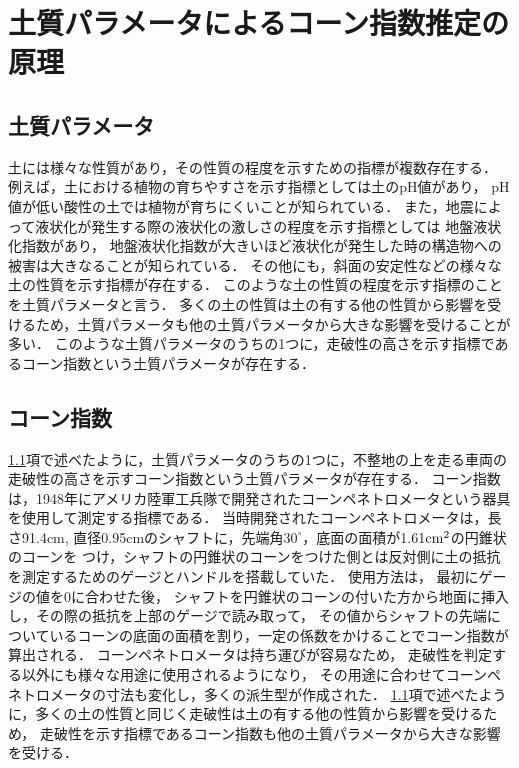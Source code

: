 \section{土質パラメータによるコーン指数推定の原理}
\label{sec:PrimciplesOfConeindexEstimation}

\subsection{土質パラメータ}
\label{ssec:SoilParameters}

土には様々な性質があり，その性質の程度を示すための指標が複数存在する．
例えば，土における植物の育ちやすさを示す指標としては土のpH値があり，
pH値が低い酸性の土では植物が育ちにくいことが知られている\cite{三枝1991}\cite{図子1993}．
また，地震によって液状化が発生する際の液状化の激しさの程度を示す指標としては
地盤液状化指数があり，
地盤液状化指数が大きいほど液状化が発生した時の構造物への被害は大きなることが知られている\cite{龍岡1980}\cite{岩崎1980}\cite{浜田1986}．
その他にも，斜面の安定性などの様々な土の性質を示す指標が存在する\cite{三笠1964}．
このような土の性質の程度を示す指標のことを土質パラメータと言う\cite{山口1986}\cite{渡部2007}．
多くの土の性質は土の有する他の性質から影響を受けるため，土質パラメータも他の土質パラメータから大きな影響を受けることが多い\cite{太田1988}\cite{三隅1992}．
このような土質パラメータのうちの1つに，走破性の高さを示す指標であるコーン指数という土質パラメータが存在する．

\subsection{コーン指数}
\label{ssec:Coneindex}

\ref{ssec:SoilParameters}項で述べたように，土質パラメータのうちの1つに，不整地の上を走る車両の走破性の高さを示すコーン指数という土質パラメータが存在する．
コーン指数は，1948年にアメリカ陸軍工兵隊で開発されたコーンペネトロメータという器具を使用して測定する指標である\cite{WES1948}\cite{Perumpral1987}．
当時開発されたコーンペネトロメータは，長さ91.4cm, 直径0.95cmのシャフトに，先端角$30^\circ$，底面の面積が1.61$\rm cm^2$の円錐状のコーンを
つけ，シャフトの円錐状のコーンをつけた側とは反対側に土の抵抗を測定するためのゲージとハンドルを搭載していた．
使用方法は，
最初にゲージの値を0に合わせた後，
シャフトを円錐状のコーンの付いた方から地面に挿入し，その際の抵抗を上部のゲージで読み取って，
その値からシャフトの先端についているコーンの底面の面積を割り，一定の係数をかけることでコーン指数が算出される．
コーンペネトロメータは持ち運びが容易なため，
走破性を判定する以外にも様々な用途に使用されるようになり，
その用途に合わせてコーンペネトロメータの寸法も変化し，多くの派生型が作成された\cite{Hendrick1969}\cite{Prather1970}．
\ref{ssec:SoilParameters}項で述べたように，多くの土の性質と同じく走破性は土の有する他の性質から影響を受けるため，
走破性を示す指標であるコーン指数も他の土質パラメータから大きな影響を受ける．


